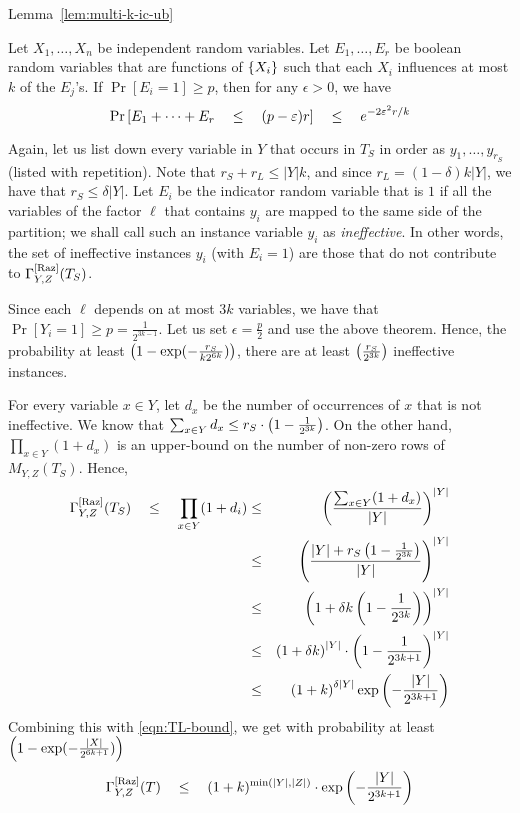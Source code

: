 \begin{proofof}{Lemma~\ref{lem:multi-k-ic-ub}}
\begin{theorem}
Let $X_1,\dots, X_n$ be independent random variables. Let $E_1,\dots, E_r$ be boolean random variables that are functions of $\left\{X_i\right\}$ such that each $X_i$ influences at most $k$ of the $E_j$'s. If $\Pr[E_i = 1] \geq p$, then for any $\epsilon > 0$, we have
\[
\Pr\left[E_1 + \dots + E_r  \quad \leq \quad (p - \varepsilon) r \right] \quad \leq \quad e^{-2\varepsilon^2 r/k}
\]
\end{theorem}

Again, let us list down every variable in $Y$ that occurs in $T_S$ in order as $y_1,\dots, y_{r_S}$ (listed with repetition). Note that $r_S + r_L \leq |Y|k$, and since $r_L = (1-\delta)k|Y|$,  we have that $r_S \leq \delta |Y|$. Let $E_i$ be the indicator random variable that is $1$ if all the variables of the factor  $\ell$ that contains $y_i$ are mapped to the same side of the partition; we shall call such an instance variable $y_i$ as \emph{ineffective}. In other words, the set of ineffective instances $y_i$ (with $E_i = 1$) are those that do not contribute to $\Gamma^{\mathrm{[Raz]}}_{Y,Z}(T_S)$. 

Since each $\ell$ depends on at most $3k$ variables, we have that $\Pr[Y_i = 1] \geq  p= \frac{1}{2^{3k-1}}$. Let us set $\epsilon = \frac{p}{2}$ and use the above theorem. Hence, the probability at least $\left(1 - \exp(-\frac{r_S}{k2^{6k}})\right)$, there are at least $\left(\frac{r_S}{2^{3k}}\right)$ ineffective instances. 

For every variable $x \in Y$, let $d_x$ be the number of occurrences of $x$ that is not ineffective. We know that $\sum_{x\in Y} d_x \leq r_S \cdot \left(1 - \frac{1}{2^{3k}}\right)$. On the other hand, $\prod_{x\in Y} (1 + d_x)$ is an upper-bound on the number of non-zero rows of $M_{Y,Z}(T_S)$. Hence,
\begin{eqnarray*}
\Gamma^{\mathrm{[Raz]}}_{Y,Z}(T_S) \quad \leq \quad\prod_{x\in Y} (1 + d_i) & \leq & \left(\frac{\sum_{x\in Y} (1 + d_x)}{|Y|}\right)^{|Y|}\\
 & \leq & \left(\frac{|Y| + r_S \left(1 - \frac{1}{2^{3k}}\right)}{|Y|}\right)^{|Y|}\\
 & \leq & \left(1 + \delta k\left(1 - \frac{1}{2^{3k}}\right)\right)^{|Y|}\\
 & \leq & \left(1+\delta k\right)^{|Y|} \cdot \left(1 - \frac{1}{2^{3k+1}}\right)^{|Y|}\\
 & \leq & \left(1+k\right)^{\delta |Y|}\exp\left(-\frac{|Y|}{2^{3k+1}}\right)
\end{eqnarray*}
Combining this with \eqref{eqn:TL-bound}, we get with probability at least $\left(1 - \exp(-\frac{|X|}{2^{6k+1}})\right)$
\[
\Gamma^{\mathrm{[Raz]}}_{Y,Z}(T) \quad \leq \quad (1+k)^{\min(|Y|,|Z|)}\cdot \exp\left(-\frac{|Y|}{2^{3k+1}}\right)
\]
\end{proofof}

